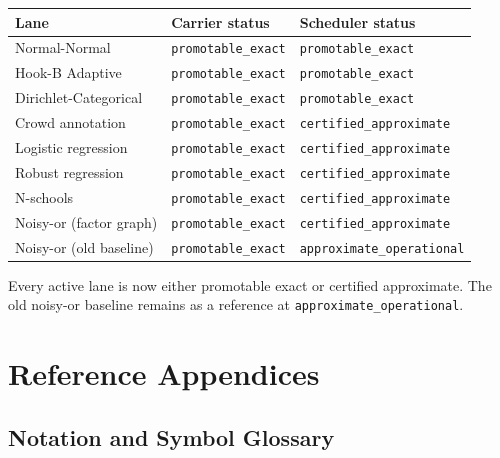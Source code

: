 \documentclass[11pt,openany]{report}
\begin{document}
\begin{center}
\small
\begin{tabular}{lll}
\toprule
Lane & Carrier status & Scheduler status \\
\midrule
Normal-Normal & \texttt{promotable\_exact} & \texttt{promotable\_exact} \\
Hook-B Adaptive & \texttt{promotable\_exact} & \texttt{promotable\_exact} \\
Dirichlet-Categorical & \texttt{promotable\_exact} & \texttt{promotable\_exact} \\
Crowd annotation & \texttt{promotable\_exact} & \texttt{certified\_approximate} \\
Logistic regression & \texttt{promotable\_exact} & \texttt{certified\_approximate} \\
Robust regression & \texttt{promotable\_exact} & \texttt{certified\_approximate} \\
N-schools & \texttt{promotable\_exact} & \texttt{certified\_approximate} \\
Noisy-or (factor graph) & \texttt{promotable\_exact} & \texttt{certified\_approximate} \\
Noisy-or (old baseline) & \texttt{promotable\_exact} & \texttt{approximate\_operational} \\
\bottomrule
\end{tabular}
\end{center}

\noindent
Every active lane is now either promotable exact or certified approximate.
The old noisy-or baseline remains as a reference at
\texttt{approximate\_operational}.

\appendix
\part{Reference Appendices}
\label{part:supplement}

\chapter{Notation and Symbol Glossary}
\label{app:notation}
\end{document}
